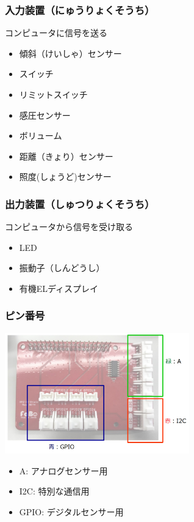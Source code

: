 \begin{frame}
    \frametitle{入力装置（にゅうりょくそうち）} 
    \begin{center}
        {コンピュータに信号を送る}
        \begin{itemize}
            \item 傾斜（けいしゃ）センサー
            \item スイッチ
            \item リミットスイッチ
            \item 感圧センサー
            \item ボリューム
            \item 距離（きょり）センサー
            \item 照度(しょうど)センサー 
        \end{itemize}
    \end{center}
\end{frame}

\begin{frame}
    \frametitle{出力装置（しゅつりょくそうち）} 
    \begin{center}
        {コンピュータから信号を受け取る}
        \begin{itemize}
            \item LED
            \item 振動子（しんどうし）
            \item 有機ELディスプレイ
        \end{itemize}
    \end{center}
\end{frame}

\begin{frame}
    \frametitle{ピン番号}
    \begin{center}
        \includegraphics[width=0.6\textwidth]{images/chap05/text05-img012.png}
        \begin{itemize}
            \item A: アナログセンサー用
            \item I2C: 特別な通信用
            \item GPIO: デジタルセンサー用
        \end{itemize}
    \end{center}
\end{frame}

